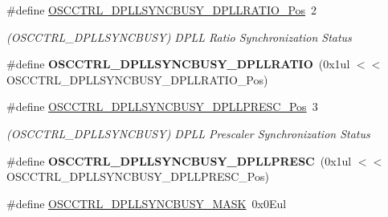 \begin{DoxyCompactItemize}
\item 
\hypertarget{group___s_a_m_l21___o_s_c_c_t_r_l_gab2f0bc0ad59bccd246390ccd8886542d}{}\#define \hyperlink{group___s_a_m_l21___o_s_c_c_t_r_l_gab2f0bc0ad59bccd246390ccd8886542d}{O\+S\+C\+C\+T\+R\+L\+\_\+\+D\+P\+L\+L\+S\+Y\+N\+C\+B\+U\+S\+Y\+\_\+\+D\+P\+L\+L\+R\+A\+T\+I\+O\+\_\+\+Pos}~2\label{group___s_a_m_l21___o_s_c_c_t_r_l_gab2f0bc0ad59bccd246390ccd8886542d}

\begin{DoxyCompactList}\small\item\em (O\+S\+C\+C\+T\+R\+L\+\_\+\+D\+P\+L\+L\+S\+Y\+N\+C\+B\+U\+S\+Y) D\+P\+L\+L Ratio Synchronization Status \end{DoxyCompactList}\item 
\hypertarget{group___s_a_m_l21___o_s_c_c_t_r_l_gab31f8516bbfc15222786328cd841fd9a}{}\#define {\bfseries O\+S\+C\+C\+T\+R\+L\+\_\+\+D\+P\+L\+L\+S\+Y\+N\+C\+B\+U\+S\+Y\+\_\+\+D\+P\+L\+L\+R\+A\+T\+I\+O}~(0x1ul $<$$<$ O\+S\+C\+C\+T\+R\+L\+\_\+\+D\+P\+L\+L\+S\+Y\+N\+C\+B\+U\+S\+Y\+\_\+\+D\+P\+L\+L\+R\+A\+T\+I\+O\+\_\+\+Pos)\label{group___s_a_m_l21___o_s_c_c_t_r_l_gab31f8516bbfc15222786328cd841fd9a}

\item 
\hypertarget{group___s_a_m_l21___o_s_c_c_t_r_l_ga72dca2e21b5cd92aaa3a2eca6501c8eb}{}\#define \hyperlink{group___s_a_m_l21___o_s_c_c_t_r_l_ga72dca2e21b5cd92aaa3a2eca6501c8eb}{O\+S\+C\+C\+T\+R\+L\+\_\+\+D\+P\+L\+L\+S\+Y\+N\+C\+B\+U\+S\+Y\+\_\+\+D\+P\+L\+L\+P\+R\+E\+S\+C\+\_\+\+Pos}~3\label{group___s_a_m_l21___o_s_c_c_t_r_l_ga72dca2e21b5cd92aaa3a2eca6501c8eb}

\begin{DoxyCompactList}\small\item\em (O\+S\+C\+C\+T\+R\+L\+\_\+\+D\+P\+L\+L\+S\+Y\+N\+C\+B\+U\+S\+Y) D\+P\+L\+L Prescaler Synchronization Status \end{DoxyCompactList}\item 
\hypertarget{group___s_a_m_l21___o_s_c_c_t_r_l_gad0bb749cd2ef372f899ed3beaea68545}{}\#define {\bfseries O\+S\+C\+C\+T\+R\+L\+\_\+\+D\+P\+L\+L\+S\+Y\+N\+C\+B\+U\+S\+Y\+\_\+\+D\+P\+L\+L\+P\+R\+E\+S\+C}~(0x1ul $<$$<$ O\+S\+C\+C\+T\+R\+L\+\_\+\+D\+P\+L\+L\+S\+Y\+N\+C\+B\+U\+S\+Y\+\_\+\+D\+P\+L\+L\+P\+R\+E\+S\+C\+\_\+\+Pos)\label{group___s_a_m_l21___o_s_c_c_t_r_l_gad0bb749cd2ef372f899ed3beaea68545}

\item 
\hypertarget{group___s_a_m_l21___o_s_c_c_t_r_l_gafbce2b9bec1e87b9116643abd7b77d6b}{}\#define \hyperlink{group___s_a_m_l21___o_s_c_c_t_r_l_gafbce2b9bec1e87b9116643abd7b77d6b}{O\+S\+C\+C\+T\+R\+L\+\_\+\+D\+P\+L\+L\+S\+Y\+N\+C\+B\+U\+S\+Y\+\_\+\+M\+A\+S\+K}~0x0\+Eul\label{group___s_a_m_l21___o_s_c_c_t_r_l_gafbce2b9bec1e87b9116643abd7b77d6b}


\end{DoxyCompactItemize}
